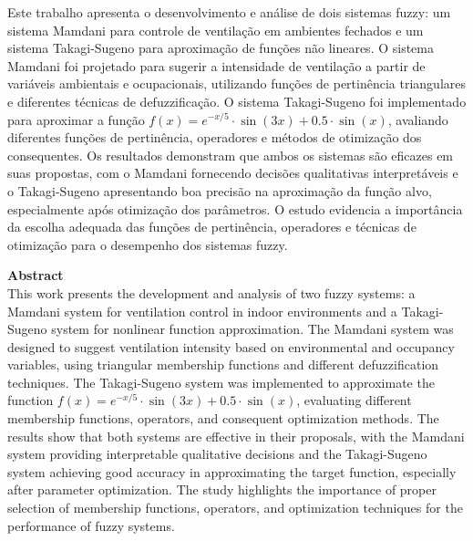 Este trabalho apresenta o desenvolvimento e análise de dois sistemas fuzzy: um sistema Mamdani para controle de ventilação em ambientes fechados e um sistema Takagi-Sugeno para aproximação de funções não lineares. O sistema Mamdani foi projetado para sugerir a intensidade de ventilação a partir de variáveis ambientais e ocupacionais, utilizando funções de pertinência triangulares e diferentes técnicas de defuzzificação. O sistema Takagi-Sugeno foi implementado para aproximar a função $f(x) = e^{-x/5} \cdot \sin(3x) + 0.5 \cdot \sin(x)$, avaliando diferentes funções de pertinência, operadores e métodos de otimização dos consequentes. Os resultados demonstram que ambos os sistemas são eficazes em suas propostas, com o Mamdani fornecendo decisões qualitativas interpretáveis e o Takagi-Sugeno apresentando boa precisão na aproximação da função alvo, especialmente após otimização dos parâmetros. O estudo evidencia a importância da escolha adequada das funções de pertinência, operadores e técnicas de otimização para o desempenho dos sistemas fuzzy.

\bigskip

\textbf{Abstract} \\
This work presents the development and analysis of two fuzzy systems: a Mamdani system for ventilation control in indoor environments and a Takagi-Sugeno system for nonlinear function approximation. The Mamdani system was designed to suggest ventilation intensity based on environmental and occupancy variables, using triangular membership functions and different defuzzification techniques. The Takagi-Sugeno system was implemented to approximate the function $f(x) = e^{-x/5} \cdot \sin(3x) + 0.5 \cdot \sin(x)$, evaluating different membership functions, operators, and consequent optimization methods. The results show that both systems are effective in their proposals, with the Mamdani system providing interpretable qualitative decisions and the Takagi-Sugeno system achieving good accuracy in approximating the target function, especially after parameter optimization. The study highlights the importance of proper selection of membership functions, operators, and optimization techniques for the performance of fuzzy systems.
